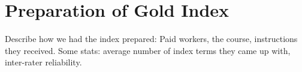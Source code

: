 \section{Preparation of Gold Index}
\label{sec:gold}

Describe how we had the index prepared: Paid workers, the course,
instructions they received. Some stats: average number of index terms
they came up with, inter-rater reliability.
